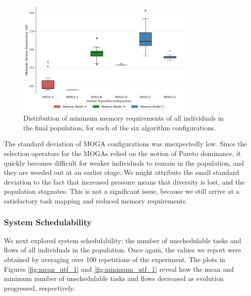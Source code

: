 \documentclass[conference]{IEEEtran}
\begin{document}
\begin{figure}[!h]
  \centering
  \includegraphics*[width=8.8cm,keepaspectratio]{img/minimum_memory_box}
\vspace{-4ex}
  \caption{Distribution of minimum memory requirements of all individuals in the final population, for each of the six algorithm configurations.}
  \label{fig:minimum_memory_box}
\vspace{-2ex}
\end{figure}

The standard deviation of MOGA configurations was unexpectedly low. Since the selection operators for the MOGAs relied on the notion of Pareto dominance, it quickly becomes difficult for weaker individuals to remain in the population, and they are weeded out at an earlier stage. We might attribute the small standard deviation to the fact that increased pressure means that diversity is lost, and the population stagnates. This is not a significant issue, because we still arrive at a satisfactory task mapping and reduced memory requirements.

\subsubsection{System Schedulability}

We next explored system schedulability: the number of unschedulable tasks and flows of all individuals in the population. Once again, the values we report were obtained by averaging over 100 repetitions of the experiment. The plots in Figures \ref{fig:mean_utf_1} and \ref{fig:minimum_utf_1} reveal how the mean and minimum number of unschedulable tasks and flows decreased as evolution progressed, respectively.
\end{document}
